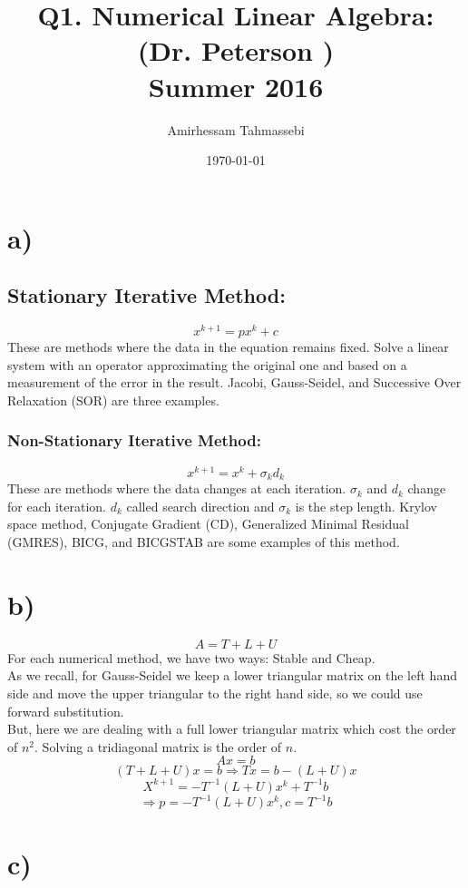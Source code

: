 \documentclass[a4paper]{article}
\title{Q1. Numerical Linear Algebra: (Dr. Peterson )\\Summer 2016}
\author{Amirhessam Tahmassebi}
\date{\today}
\begin{document}
\maketitle


 

\section*{a)}


\subsection*{Stationary Iterative Method:}
$$x^{k+1} = p x^k + c$$
These are methods where the data in the equation remains fixed. Solve a linear system with an operator approximating the original one and based on a measurement of the error in the result. Jacobi, Gauss-Seidel, and Successive Over Relaxation (SOR) are three examples.
\subsubsection*{Non-Stationary Iterative Method:}
$$x^{k+1} =  x^k + \sigma_k d_k$$
These are methods where the data changes at each iteration. $\sigma_k$ and $d_k$ change for each iteration. $d_k$ called search direction and $\sigma_k$ is the step length. Krylov space method, Conjugate Gradient (CD), Generalized Minimal Residual (GMRES), BICG, and BICGSTAB are some examples of this method.


\section*{b)}
$$A = T + L +U $$
For each numerical method, we have two ways: Stable and Cheap.\\
As we recall, for Gauss-Seidel we keep a lower triangular matrix on the left hand side and move the upper triangular to the right hand side, so we could use forward substitution.\\
But, here we are dealing with a full lower triangular matrix which cost the order of $n^2$. Solving a tridiagonal matrix is the order of $n$.
$$Ax = b$$
$$(T + L + U) x = b \Rightarrow Tx = b - (L+U)x$$
$$ X ^{k+1} = -T^{-1} (L+U)x^k + T^{-1} b$$
$$\Rightarrow p =-T^{-1} (L+U)x^k , c= T^{-1} b $$


\section*{c)}
\end{document}

